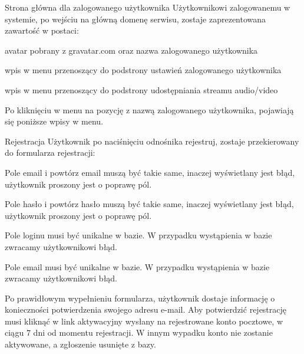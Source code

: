 \begin{userstory}{Strona główna dla zalogowanego użytkownika}
    Użytkownikowi zalogowanemu w systemie, po wejściu na główną domenę serwisu, zostaje zaprezentowana zawartość w postaci:
    \begin{packed_enum}
        \item avatar pobrany z gravatar.com oraz nazwa zalogowanego użytkownika
        \item wpis w menu przenoszący do podstrony ustawień zalogowanego użytkownika
        \item wpis w menu przenoszący do podstrony udostępniania streamu audio/video
    \end{packed_enum}
    \begin{tests}
        \item{
            Po kliknięciu w menu na pozycję z nazwą zalogowanego użytkownika, pojawiają się poniższe wpisy w menu.
        }
    \end{tests}
\end{userstory}

\begin{userstory}{Rejestracja}
    Użytkownik po naciśnięciu odnośnika rejestruj,
    zostaje przekierowany do formularza rejestracji:
    \begin{tests}
        \item{
            Pole email i powtórz email muszą być takie same, inaczej wyświetlany jest błąd, użytkownik proszony jest o poprawę pól.
        }
        \item{
            Pole hasło i powtórz hasło muszą być takie same, inaczej wyświetlany jest błąd, użytkownik proszony jest o poprawę pól.
        }
        \item{
            Pole loginu musi być unikalne w bazie. W przypadku wystąpienia w bazie zwracamy użytkownikowi błąd.
        }
        \item{
            Pole email musi być unikalne w bazie. W przypadku wystąpienia w bazie zwracamy użytkownikowi błąd.
        }
        \item{
            Po prawidłowym wypełnieniu formularza, użytkownik dostaje informację o konieczności potwierdzenia swojego adresu e-mail. Aby potwierdzić rejestrację musi kliknąć w link aktywacyjny wysłany na rejestrowane konto pocztowe, w ciągu 7 dni od momentu rejestracji. W innym wypadku konto nie zostanie aktywowane, a zgłoszenie usunięte z bazy.
        }
    \end{tests}
\end{userstory}

